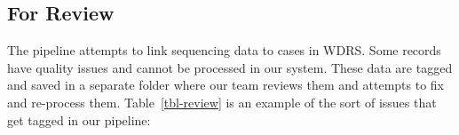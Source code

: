 \documentclass[
  letterpaper,
  DIV=11,
  numbers=noendperiod]{scrartcl}
\begin{document}
\begin{figure}[H]


\caption{\label{fig-examplewdrs}}

\end{figure}%

\subsection{For Review}\label{for-review}

The pipeline attempts to link sequencing data to cases in WDRS. Some
records have quality issues and cannot be processed in our system. These
data are tagged and saved in a separate folder where our team reviews
them and attempts to fix and re-process them. Table~\ref{tbl-review} is
an example of the sort of issues that get tagged in our pipeline:
\end{document}
